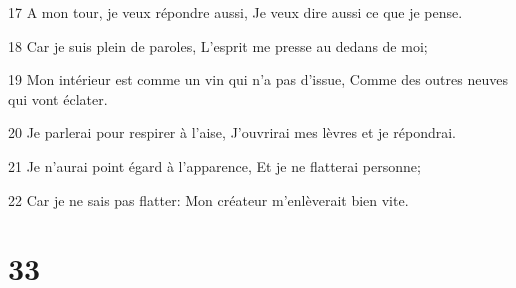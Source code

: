 \par 17 A mon tour, je veux répondre aussi, Je veux dire aussi ce que je pense.
\par 18 Car je suis plein de paroles, L'esprit me presse au dedans de moi;
\par 19 Mon intérieur est comme un vin qui n'a pas d'issue, Comme des outres neuves qui vont éclater.
\par 20 Je parlerai pour respirer à l'aise, J'ouvrirai mes lèvres et je répondrai.
\par 21 Je n'aurai point égard à l'apparence, Et je ne flatterai personne;
\par 22 Car je ne sais pas flatter: Mon créateur m'enlèverait bien vite.

\chapter{33}

